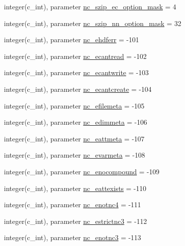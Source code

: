 \begin{DoxyCompactItemize}
\item 
integer(c\+\_\+int), parameter \hyperlink{namespacenetcdf__nc__data_aca19d8ddf38493b2a61e0d746bd01534}{nc\+\_\+szip\+\_\+ec\+\_\+option\+\_\+mask} = 4
\item 
integer(c\+\_\+int), parameter \hyperlink{namespacenetcdf__nc__data_a6a769b2ec5c5877b73f7f2cbc79c184f}{nc\+\_\+szip\+\_\+nn\+\_\+option\+\_\+mask} = 32
\item 
integer(c\+\_\+int), parameter \hyperlink{namespacenetcdf__nc__data_a1169af4f3c40cf31b785e21f2dbd5ec0}{nc\+\_\+ehdferr} = -\/101
\item 
integer(c\+\_\+int), parameter \hyperlink{namespacenetcdf__nc__data_a7c09644694f0dbb0d805a8847d8ba892}{nc\+\_\+ecantread} = -\/102
\item 
integer(c\+\_\+int), parameter \hyperlink{namespacenetcdf__nc__data_a137d59869772609c6b055b4935e205b9}{nc\+\_\+ecantwrite} = -\/103
\item 
integer(c\+\_\+int), parameter \hyperlink{namespacenetcdf__nc__data_a4b769146020153d93441a502218706e0}{nc\+\_\+ecantcreate} = -\/104
\item 
integer(c\+\_\+int), parameter \hyperlink{namespacenetcdf__nc__data_af93ef78d159c77b159bc56f000e51824}{nc\+\_\+efilemeta} = -\/105
\item 
integer(c\+\_\+int), parameter \hyperlink{namespacenetcdf__nc__data_add520bc3a4ddd4262455c5ea1bf98f1e}{nc\+\_\+edimmeta} = -\/106
\item 
integer(c\+\_\+int), parameter \hyperlink{namespacenetcdf__nc__data_a26356b327c9de1414e34445334d3fcad}{nc\+\_\+eattmeta} = -\/107
\item 
integer(c\+\_\+int), parameter \hyperlink{namespacenetcdf__nc__data_aa1c9018bd64fdff140ce7bbf2b2408ff}{nc\+\_\+evarmeta} = -\/108
\item 
integer(c\+\_\+int), parameter \hyperlink{namespacenetcdf__nc__data_a9253ff8006f31d3554d0d462ccd2480e}{nc\+\_\+enocompound} = -\/109
\item 
integer(c\+\_\+int), parameter \hyperlink{namespacenetcdf__nc__data_ad0ebf9a9a2d73ffe3587ea832e5a0f68}{nc\+\_\+eattexists} = -\/110
\item 
integer(c\+\_\+int), parameter \hyperlink{namespacenetcdf__nc__data_a2be3d7ec691b7c8803115abebe6bac27}{nc\+\_\+enotnc4} = -\/111
\item 
integer(c\+\_\+int), parameter \hyperlink{namespacenetcdf__nc__data_a31d4e1a356ae4e6fc421a82870a3db6e}{nc\+\_\+estrictnc3} = -\/112
\item 
integer(c\+\_\+int), parameter \hyperlink{namespacenetcdf__nc__data_af7cee79d1f60767652c5a80ad1917aed}{nc\+\_\+enotnc3} = -\/113

\end{DoxyCompactItemize}
